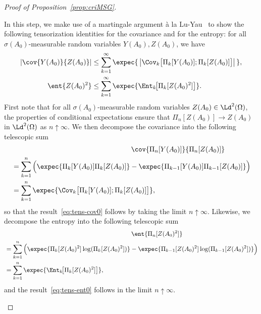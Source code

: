 \begin{proof}[Proof of Proposition~\ref{prop:criMSG}]
\begin{step}
In this step, we make use of a martingale argument à la Lu-Yau~\cite{Lu-Yau-93} to show the following tensorization identities for the covariance and for the entropy: for all $\sigma(A_0)$-measurable random variables $Y(A_0),Z(A_0)$, we have
\begin{align}
|\cov{Y(A_0)}{Z(A_0)}|&\le\sum_{k=1}^\infty\expec{\,\big|\Cov_{k}\big[\Pi_{k}[Y(A_0)];\Pi_{k}[Z(A_0)]\big]\big|\,},\label{eq:tens-cov0}\\
\ent{Z(A_0)^2}&\le\sum_{k=1}^\infty\expec{\Ent_{k}\!\big[\Pi_k[Z(A_0)^2]\big]}.\label{eq:tens-ent0}
\end{align}
First note that for all $\sigma(A_0)$-measurable random variables $Z(A_0)\in\Ld^2(\Omega)$, the properties of conditional expectations ensure that $\Pi_n[Z(A_0)]\to Z(A_0)$ in $\Ld^2(\Omega)$ as $n\uparrow\infty$. We then decompose the covariance into the following telescopic sum
\begin{multline*}
\lefteqn{\cov{\Pi_n[Y(A_0)]}{\Pi_n[Z(A_0)]}}
\\
\begin{aligned}
&=\sum_{k=1}^n\Big(\expec{\Pi_k[Y(A_0)]\Pi_k[Z(A_0)]}-\expec{\Pi_{k-1}[Y(A_0)]\Pi_{k-1}[Z(A_0)]}\Big)\\
&=\sum_{k=1}^n\expec{\Cov_{k}\big[\Pi_{k}[Y(A_0)];\Pi_{k}[Z(A_0)]\big]},
\end{aligned}
\end{multline*}
so that the result~\eqref{eq:tens-cov0} follows by taking the limit $n\uparrow\infty$. Likewise, we decompose the entropy into the following telescopic sum
\begin{multline*}
\lefteqn{\ent{\Pi_n[Z(A_0)^2]}}\\
\begin{aligned}
&=\sum_{k=1}^n\Big(\expec{\Pi_k[Z(A_0)^2]\log(\Pi_k[Z(A_0)^2])}-\expec{\Pi_{k-1}[Z(A_0)^2]\log(\Pi_{k-1}[Z(A_0)^2])}\Big)\\
&=\sum_{k=1}^n\expec{\Ent_{k}\!\big[\Pi_k[Z(A_0)^2]\big]},
\end{aligned}
\end{multline*}
and the result~\eqref{eq:tens-ent0} follows in the limit $n\uparrow\infty$.
\end{step}


\end{proof}
